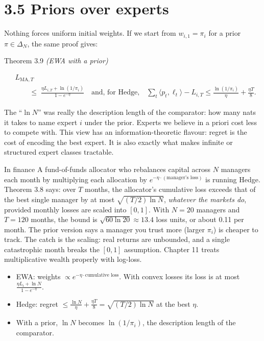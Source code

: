 \documentclass[11pt,a4paper,openany]{book}
\newcommand{\ip}[2]{\langle #1,#2\rangle}
\newcommand{\simplex}{\Delta}
\begin{document}
\section*{3.5 Priors over experts}\label{ch3-prior}

Nothing forces uniform initial weights. If we start from $w_{i,1}=\pi_i$ for a prior $\pi\in\simplex_N$, the same proof gives:

\begin{bthm}{Theorem 3.9 \emph{(EWA with a prior)}}

\[\begin{aligned}&L_{\mathrm{MA},T}\\
&\qquad\le\;\frac{\eta L_{i,T}+\ln(1/\pi_i)}{1-e^{-\eta}}\quad\text{and, for Hedge,}\quad \sum_t\ip{p_t}{\ell_t}-L_{i,T}\le\frac{\ln(1/\pi_i)}{\eta}+\frac{\eta T}8.\end{aligned}\]

\end{bthm}

The ``$\ln N$'' was really the description length of the comparator: how many nats it takes to name expert $i$ under the prior. Experts we believe in a priori cost less to compete with. This view has an information-theoretic flavour: regret is the cost of encoding the best expert. It is also exactly what makes infinite or structured expert classes tractable.

\begin{bfin}{In finance}
A fund-of-funds allocator who rebalances capital across $N$ managers each month by multiplying each allocation by $e^{-\eta\cdot(\text{manager's loss})}$ is running Hedge. Theorem 3.8 says: over $T$ months, the allocator's cumulative loss exceeds that of the best single manager by at most $\sqrt{(T/2)\ln N}$, \emph{whatever the markets do}, provided monthly losses are scaled into $[0,1]$. With $N=20$ managers and $T=120$ months, the bound is $\sqrt{60\ln20}\approx13.4$ loss units, or about 0.11 per month. The prior version says a manager you trust more (larger $\pi_i$) is cheaper to track. The catch is the scaling: real returns are unbounded, and a single catastrophic month breaks the $[0,1]$ assumption. Chapter 11 treats multiplicative wealth properly with log-loss.
\end{bfin}

\begin{takeaways}
\begin{itemize}
\item EWA: weights $\propto e^{-\eta\cdot\text{cumulative loss}}$. With convex losses its loss is at most $\frac{\eta L_i+\ln N}{1-e^{-\eta}}$.
\item Hedge: regret $\le\frac{\ln N}\eta+\frac{\eta T}8=\sqrt{(T/2)\ln N}$ at the best $\eta$.
\item With a prior, $\ln N$ becomes $\ln(1/\pi_i)$, the description length of the comparator.
\end{itemize}
\end{takeaways}
\end{document}
